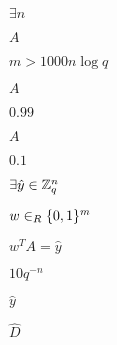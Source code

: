 \documentclass[10pt]{book}
\begin{document}
\begin{mdSnippets}
\begin{mdInlineSnippet}[2a4631f012e06d2d29fb46e7cdae55dd]%
$\exists n$\end{mdInlineSnippet}%
\begin{mdInlineSnippet}[7fc56270e7a70fa81a5935b72eacbe29]%
$A$\end{mdInlineSnippet}%
\begin{mdInlineSnippet}[0285994f32e717aa785cb7fb36c46fde]%
$m > 1000n \log q$\end{mdInlineSnippet}%
\begin{mdInlineSnippet}[7fc56270e7a70fa81a5935b72eacbe29]%
$A$\end{mdInlineSnippet}%
\begin{mdInlineSnippet}%
$0.99$\end{mdInlineSnippet}%
\begin{mdInlineSnippet}[7fc56270e7a70fa81a5935b72eacbe29]%
$A$\end{mdInlineSnippet}%
\begin{mdInlineSnippet}[cb5ae17636e975f9bf71ddf5bc542075]%
$0.1$\end{mdInlineSnippet}%
\begin{mdInlineSnippet}%
$\exists \hat{y} \in \mathbb{Z}_q^n$\end{mdInlineSnippet}%
\begin{mdInlineSnippet}[8d117c0e829de49255c23409dc643b81]%
$w \in_R \{0,1\}^m$\end{mdInlineSnippet}%
\begin{mdInlineSnippet}[b6441b8ff8e1e72da55140a40ef0d00e]%
$w^T A = \hat{y}$\end{mdInlineSnippet}%
\begin{mdInlineSnippet}[fd2d3c577f03b2f1673f677d541644ae]%
$10 q^{-n}$\end{mdInlineSnippet}%
\begin{mdInlineSnippet}[5d28a7ba1a44a73b8c2ed21321697c59]%
$\hat{y}$\end{mdInlineSnippet}%
\begin{mdInlineSnippet}[4587a9c1f8d3a5ddf27bc343c807f4fc]%
$\hat{D}$\end{mdInlineSnippet}%

\end{mdSnippets}
\end{document}
